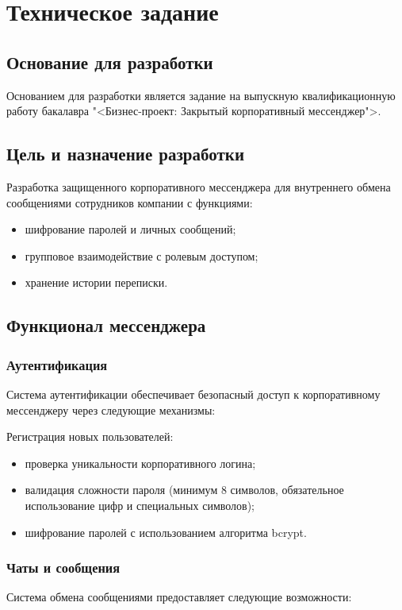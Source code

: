 \section{Техническое задание}
\subsection{Основание для разработки}

Основанием для разработки является задание на выпускную квалификационную работу бакалавра "<Бизнес-проект: Закрытый корпоративный мессенджер">.

\subsection{Цель и назначение разработки}

Разработка защищенного корпоративного мессенджера для внутреннего обмена сообщениями сотрудников компании с функциями:
\begin{itemize}
	\item шифрование паролей и личных сообщений;
	\item групповое взаимодействие с ролевым доступом;
	\item хранение истории переписки.
\end{itemize}

	
\subsection{Функционал мессенджера}

\subsubsection{Аутентификация}
Система аутентификации обеспечивает безопасный доступ к корпоративному мессенджеру через следующие механизмы:

Регистрация новых пользователей:

	\begin{itemize}
		\item проверка уникальности корпоративного логина;
		\item валидация сложности пароля (минимум 8 символов, обязательное использование цифр и специальных символов);
		\item шифрование паролей с использованием алгоритма bcrypt.
	\end{itemize}

\subsubsection{Чаты и сообщения}
Система обмена сообщениями предоставляет следующие возможности:

